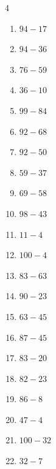 \begin{multicols}{4}
\begin{enumerate}
\columnbreak %

  \item $94-17$
        \phantom{$=77$}

  \item $94-36$
        \phantom{$=58$}

  \item $76-59$
        \phantom{$=17$}

  \item $36-10$
        \phantom{$=26$}

  \item $99-84$
        \phantom{$=15$}

  \item $92-68$
        \phantom{$=24$}

  \item $92-50$
        \phantom{$=42$}

  \item $59-37$
        \phantom{$=22$}

  \item $69-58$
        \phantom{$=11$}

  \item $98-43$
        \phantom{$=55$}

  \item $11-4$
        \phantom{$=7$}

  \item $100-4$
        \phantom{$=96$}

  \item $83-63$
        \phantom{$=20$}

  \item $90-23$
        \phantom{$=67$}

  \item $63-45$
        \phantom{$=18$}

  \item $87-45$
        \phantom{$=42$}

  \item $83-20$
        \phantom{$=63$}

  \item $82-23$
        \phantom{$=59$}

  \item $86-8$
        \phantom{$=78$}

  \item $47-4$
        \phantom{$=43$}

  \item $100-32$
        \phantom{$=68$}

  \item $32-7$
        \phantom{$=25$}


\end{enumerate}
\end{multicols}
